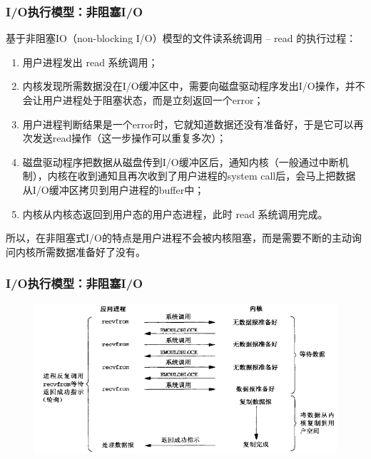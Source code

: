 \begin{frame}[fragile]
    \frametitle{I/O执行模型：非阻塞I/O}
    基于非阻塞IO（non-blocking I/O）模型的文件读系统调用 – read 的执行过程：
    \begin{enumerate}
        
        \item 用户进程发出 read 系统调用；
        \item 内核发现所需数据没在I/O缓冲区中，需要向磁盘驱动程序发出I/O操作，并不会让用户进程处于阻塞状态，而是立刻返回一个error；
        \item 用户进程判断结果是一个error时，它就知道数据还没有准备好，于是它可以再次发送read操作（这一步操作可以重复多次）；
        \item 磁盘驱动程序把数据从磁盘传到I/O缓冲区后，通知内核（一般通过中断机制），内核在收到通知且再次收到了用户进程的system call后，会马上把数据从I/O缓冲区拷贝到用户进程的buffer中；
        \item 内核从内核态返回到用户态的用户态进程，此时 read 系统调用完成。
    \end{enumerate}       
    
    所以，在非阻塞式I/O的特点是用户进程不会被内核阻塞，而是需要不断的主动询问内核所需数据准备好了没有。
    
\end{frame}
\begin{frame}[fragile]
    \frametitle{I/O执行模型：非阻塞I/O}
    \begin{figure}
        \includegraphics[width=0.8\linewidth]{figs/nonblock-io.png}
    \end{figure}
\end{frame}
